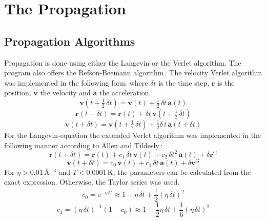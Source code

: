 \documentclass[twoside, 11pt, titlepage, captions=nooneline, a4paper, headsepline]{scrbook}%
\newcommand{\9}{\mathrm}
\newcommand{\0}{\,\mathrm}
\begin{document}
\section{The Propagation}
\subsection{Propagation Algorithms}
Propagation is done using either the Langevin or the Verlet algorithm. The program also offers the Refson-Beemann algorithm\,\cite{refson1985}. The velocity Verlet algorithm was implemented in the following form\,\cite{allen1989} where $\delta t$ is the time step, $\mathbf{r}$ is the position, $\mathbf{v}$ the velocity and $\mathbf{a}$ the acceleration. 
\begin{equation}\label{Eq:Verlet_v1}
\mathbf{v}(t+\tfrac{1}{2}\,\delta t)=\mathbf{v}(t)+\tfrac{1}{2}\,\delta t \,\mathbf{a}(t)
\end{equation}
\begin{equation}\label{Eq:Verlet_r1}
\mathbf{r}(t+\delta t)=\mathbf{r}(t)+\delta t\, \mathbf{v}(t+\tfrac{1}{2}\,\delta t)
\end{equation}
\begin{equation}\label{Eq:Verlet_v2}
\mathbf{v}(t+\delta t)=\mathbf{v}(t+\tfrac{1}{2}\,\delta t)+ \tfrac{1}{2}\delta\, t\,\mathbf{a}(t+\delta t)
\end{equation}
For the Langevin-equation the extended Verlet algorithm was implemented in the following manner according to Allen and Tildesly\,\cite{allen1989}:
\begin{equation}\label{Eq:Langevin_r}
\mathbf{r}(t+\delta t)=\mathbf{r}(t)+c_1\,\delta t\,\mathbf{v}(t)+c_2\,\delta t^2\,\mathbf{a}(t)+\delta\mathbf{r}^\mathrm{G}
\end{equation}
\begin{equation}\label{Eq:Langevin_v}
\mathbf{v}(t+\delta t)=c_0\,\mathbf{v}(t)+c_1\,\delta t\,\mathbf{a}(t)+\delta\mathbf{v}^\mathrm{G}
\end{equation}
For $\eta>0.01$\,\AA$^{-3}$ and $T<0.0001$\,K, the parameters can be calculated from the exact expression. Otherwise, the Taylor series was used.
\begin{equation}
c_0=\mathrm{e}^{-\eta\,\delta t}\approx 1-\eta\,\delta t+\frac{1}{2} (\eta\,\delta t)^2
\end{equation}
\begin{equation}
c_1=(\eta\,\delta t)^{-1}(1-c_0)\approx 1-\frac{1}{2}\eta\,\delta t+\frac{1}{6}(\eta\,\delta t)^2
\end{equation}
\end{document}
